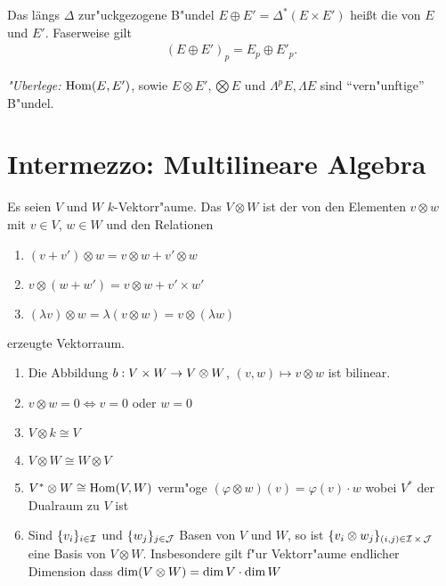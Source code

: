 \begin{center}\end{center}

Das längs $\Delta$ zur"uckgezogene B"undel $E \oplus E' = \Delta^{\ast}(E \times E')$ heißt die  von $E$ und $E'$.
Faserweise gilt
\begin{align*}
  (E \oplus E')_p = E_p \oplus E'_p.
\end{align*}
 
\emph{"Uberlege:} $\operatorname{Hom}(E,E')$, sowie $E \otimes E', \bigotimes E$ und $\Lambda^pE, \Lambda E$ sind "`vern"unftige"' B"undel.

\section{Intermezzo: Multilineare Algebra}
Es seien $V$ und $W$ $k$-Vektorr"aume. Das  $V \otimes W$ ist der von den Elementen $v \otimes w$ mit $v \in V$, $w \in W$ und den Relationen \begin{enumerate}[label=(\roman*),widest=iii]
\item
	$(v + v') \otimes w = v \otimes w + v' \otimes w$
\item
	$v \otimes (w + w') = v \otimes w + v' \times w'$
\item
	$(\lambda v) \otimes w = \lambda (v \otimes w) = v \otimes (\lambda w)$
\end{enumerate} erzeugte Vektorraum.

\begin{emptythm}[Eigenschaften:]\begin{enumerate}[label=\arabic*),leftmargin=*]
\item
	Die Abbildung $b: V \times W \to V \otimes W$, $(v, w) \mapsto v \otimes w$ ist bilinear.
\item
	$v \otimes w = 0 \Leftrightarrow v = 0$ oder $w = 0$
\item
	$V \otimes k \cong V$
\item
	$V \otimes W \cong W \otimes V$
\item
	$V^* \otimes W \cong \operatorname{Hom}(V, W)$ verm"oge $(\varphi \otimes w)(v) = \varphi(v) \cdot w$ wobei $V^*$ der \gls{Dualraum} zu $V$ ist
\item
	Sind $\{v_i\}_{i \in \operatorname{\mathcal{I}}}$ und $\{w_j\}_{j \in \operatorname{\mathcal{J}}}$ Basen von $V$ und $W$, so ist $\{v_i \otimes w_j\}_{(i,j) \in \operatorname{\mathcal{I}} \times \operatorname{\mathcal{J}}}$ eine Basis von $V \otimes W$. Insbesondere gilt f"ur Vektorr"aume endlicher Dimension dass $\operatorname{dim} (V \otimes W) = \operatorname{dim} V \cdot \operatorname{dim} W$
\end{enumerate}\end{emptythm}

